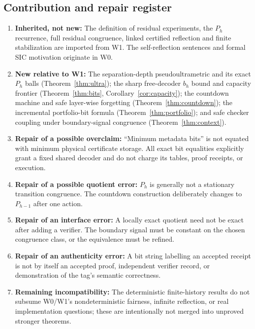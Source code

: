 \documentclass[11pt,letterpaper]{article}
\begin{document}
\subsection*{Contribution and repair register}
\begin{enumerate}[leftmargin=*,itemsep=.25em]
\item \textbf{Inherited, not new:} The definition of residual experiments, the $P_h$ recurrence, full residual congruence, linked certified reflection and finite stabilization are imported from W1. The self-reflection sentences and formal SIC motivation originate in W0.
\item \textbf{New relative to W1:} The separation-depth pseudoultrametric and its exact $P_h$ balls (Theorem~\ref{thm:ultra}); the sharp free-decoder $b_h$ bound and capacity frontier (Theorem~\ref{thm:bits}, Corollary~\ref{cor:capacity}); the countdown machine and safe layer-wise forgetting (Theorem~\ref{thm:countdown}); the incremental portfolio-bit formula (Theorem~\ref{thm:portfolio}); and safe checker coupling under boundary-signal congruence (Theorem~\ref{thm:context}).
\item \textbf{Repair of a possible overclaim:} ``Minimum metadata bits'' is not equated with minimum physical certificate storage. All exact bit equalities explicitly grant a fixed shared decoder and do not charge its tables, proof receipts, or execution.
\item \textbf{Repair of a possible quotient error:} $P_h$ is generally not a stationary transition congruence. The countdown construction deliberately changes to $P_{h-1}$ after one action.
\item \textbf{Repair of an interface error:} A locally exact quotient need not be exact after adding a verifier. The boundary signal must be constant on the chosen congruence class, or the equivalence must be refined.
\item \textbf{Repair of an authenticity error:} A bit string labelling an accepted receipt is not by itself an accepted proof, independent verifier record, or demonstration of the tag's semantic correctness.
\item \textbf{Remaining incompatibility:} The deterministic finite-history results do not subsume W0/W1's nondeterministic fairness, infinite reflection, or real implementation questions; these are intentionally not merged into unproved stronger theorems.
\end{enumerate}
\end{document}
